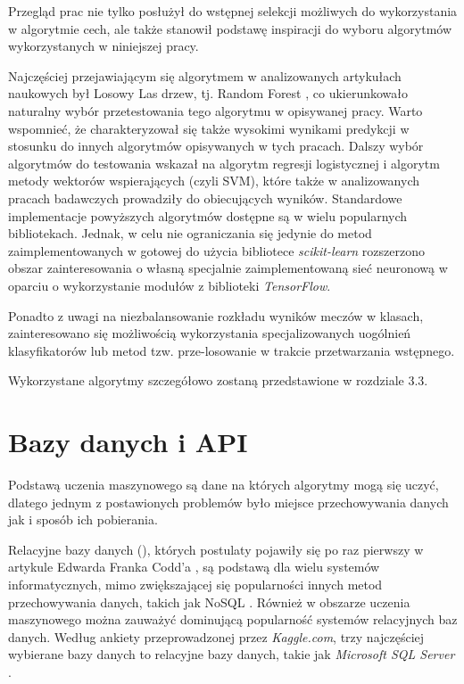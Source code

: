 Przegląd prac nie tylko posłużył do wstępnej selekcji możliwych do wykorzystania w algorytmie cech, ale także stanowił podstawę inspiracji do wyboru algorytmów wykorzystanych w niniejszej pracy. 

Najczęściej przejawiającym się algorytmem w analizowanych artykułach naukowych był Losowy Las drzew, tj. Random Forest \cite{CanMLPrecict} \cite{KagglePredict} \cite{BundesligaPredict} \cite{TowardDataPredict}, co ukierunkowało naturalny wybór przetestowania tego algorytmu w opisywanej pracy. Warto wspomnieć, że charakteryzował się także wysokimi wynikami predykcji w stosunku do innych algorytmów opisywanych w tych pracach. Dalszy wybór algorytmów do testowania wskazał na algorytm regresji logistycznej i algorytm metody wektorów wspierających (czyli SVM), które także w analizowanych pracach badawczych \cite{CanMLPrecict} \cite{KagglePredict} prowadziły do  obiecujących wyników. Standardowe implementacje powyższych algorytmów dostępne są w wielu popularnych bibliotekach. Jednak, w celu nie ograniczania się jedynie do metod zaimplementowanych w gotowej do użycia bibliotece \textit{scikit-learn} rozszerzono obszar zainteresowania o własną specjalnie zaimplementowaną sieć neuronową \cite{CanMLPrecict} \cite{BundesligaPredict} w oparciu o wykorzystanie modułów z biblioteki \textit{TensorFlow}. 

Ponadto z uwagi na niezbalansowanie rozkładu wyników meczów w klasach, zainteresowano się możliwością wykorzystania specjalizowanych uogólnień klasyfikatorów lub metod tzw. prze-losowanie w trakcie przetwarzania wstępnego.

Wykorzystane algorytmy szczegółowo zostaną przedstawione w rozdziale 3.3.

\section{Bazy danych i API}
Podstawą uczenia maszynowego są dane na których algorytmy mogą się uczyć, dlatego jednym z postawionych problemów było miejsce przechowywania danych jak i sposób ich pobierania.

Relacyjne bazy danych (), których postulaty pojawiły się po raz pierwszy w artykule Edwarda Franka Codd'a \cite{Codd}, są podstawą dla wielu systemów informatycznych, mimo zwiększającej się popularności innych metod przechowywania danych, takich jak NoSQL \cite{RBD_popularity_2016}. Również w obszarze uczenia maszynowego można zauważyć dominującą popularność systemów relacyjnych baz danych. Według ankiety przeprowadzonej przez \textit{Kaggle.com}, trzy najczęściej wybierane bazy danych to relacyjne bazy danych, takie jak \textit{Microsoft SQL Server} \cite{RDB_popularity_kaggle_2020}.

